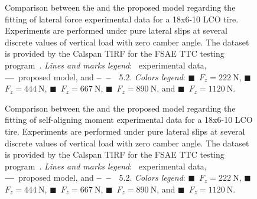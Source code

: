 \begin{figure}[htb]
  \centering
  \small{}
  \caption{Comparison between the \MagicFormulae{} and the proposed model regarding the fitting of lateral force experimental data for a \Hoosier{} 18x6-10 LCO tire. Experiments are performed under pure lateral slips at several discrete values of vertical load with zero camber angle. The dataset is provided by the Calspan \ac{TIRF} for the \ac{FSAE} \ac{TTC} testing program~\cite{kasprzak2006formula}. \emph{Lines and marks legend}: \textbullet~experimental data, \textbf{---}~proposed model, and \textbf{--~--}~\MagicFormulae{}~5.2. \emph{Colors legend}: \textcolor{mycolor1}{$\blacksquare$}~$F_z = \SI{222}{\newton}$, \textcolor{mycolor2}{$\blacksquare$}~$F_z = \SI{444}{\newton}$, \textcolor{mycolor3}{$\blacksquare$}~$F_z = \SI{667}{\newton}$, \textcolor{mycolor4}{$\blacksquare$}~$F_z = \SI{890}{\newton}$, and \textcolor{mycolor5}{$\blacksquare$}~$F_z = \SI{1120}{\newton}$.}
  \label{app3:fig:fsae_pure_Fy}
\end{figure}

\begin{figure}[htb]
  \centering
  \small{}
  \caption{Comparison between the \MagicFormulae{} and the proposed model regarding the fitting of self-aligning moment experimental data for a \Hoosier{} 18x6-10 LCO tire. Experiments are performed under pure lateral slips at several discrete values of vertical load with zero camber angle. The dataset is provided by the Calspan \ac{TIRF} for the \ac{FSAE} \ac{TTC} testing program~\cite{kasprzak2006formula}. \emph{Lines and marks legend}: \textbullet~experimental data, \textbf{---}~proposed model, and \textbf{--~--}~\MagicFormulae{}~5.2. \emph{Colors legend}: \textcolor{mycolor1}{$\blacksquare$}~$F_z = \SI{222}{\newton}$, \textcolor{mycolor2}{$\blacksquare$}~$F_z = \SI{444}{\newton}$, \textcolor{mycolor3}{$\blacksquare$}~$F_z = \SI{667}{\newton}$, \textcolor{mycolor4}{$\blacksquare$}~$F_z = \SI{890}{\newton}$, and \textcolor{mycolor5}{$\blacksquare$}~$F_z = \SI{1120}{\newton}$.}
  \label{app3:fig:fsae_pure_Mz}
\end{figure}

